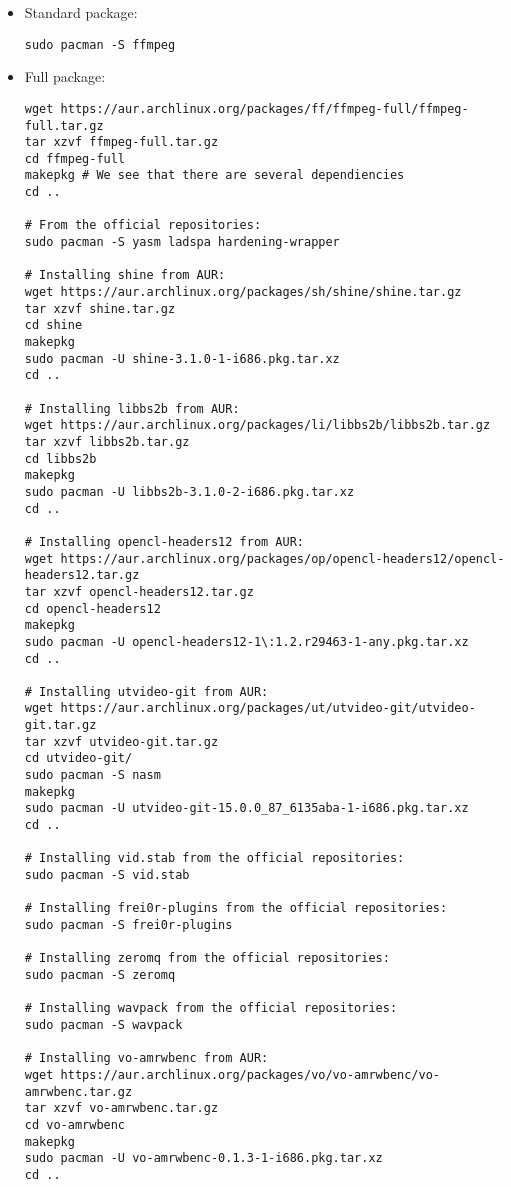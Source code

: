 \begin{itemize}
\item Standard package:

\begin{verbatim}
sudo pacman -S ffmpeg
\end{verbatim}


\item Full package:
\begin{verbatim}
wget https://aur.archlinux.org/packages/ff/ffmpeg-full/ffmpeg-full.tar.gz
tar xzvf ffmpeg-full.tar.gz
cd ffmpeg-full
makepkg # We see that there are several dependiencies
cd ..

# From the official repositories:
sudo pacman -S yasm ladspa hardening-wrapper

# Installing shine from AUR:
wget https://aur.archlinux.org/packages/sh/shine/shine.tar.gz
tar xzvf shine.tar.gz
cd shine
makepkg
sudo pacman -U shine-3.1.0-1-i686.pkg.tar.xz
cd ..

# Installing libbs2b from AUR:
wget https://aur.archlinux.org/packages/li/libbs2b/libbs2b.tar.gz
tar xzvf libbs2b.tar.gz
cd libbs2b
makepkg
sudo pacman -U libbs2b-3.1.0-2-i686.pkg.tar.xz
cd ..

# Installing opencl-headers12 from AUR:
wget https://aur.archlinux.org/packages/op/opencl-headers12/opencl-headers12.tar.gz
tar xzvf opencl-headers12.tar.gz
cd opencl-headers12
makepkg
sudo pacman -U opencl-headers12-1\:1.2.r29463-1-any.pkg.tar.xz
cd ..

# Installing utvideo-git from AUR:
wget https://aur.archlinux.org/packages/ut/utvideo-git/utvideo-git.tar.gz
tar xzvf utvideo-git.tar.gz 
cd utvideo-git/
sudo pacman -S nasm
makepkg
sudo pacman -U utvideo-git-15.0.0_87_6135aba-1-i686.pkg.tar.xz
cd ..

# Installing vid.stab from the official repositories:
sudo pacman -S vid.stab

# Installing frei0r-plugins from the official repositories:
sudo pacman -S frei0r-plugins

# Installing zeromq from the official repositories:
sudo pacman -S zeromq

# Installing wavpack from the official repositories:
sudo pacman -S wavpack

# Installing vo-amrwbenc from AUR:
wget https://aur.archlinux.org/packages/vo/vo-amrwbenc/vo-amrwbenc.tar.gz
tar xzvf vo-amrwbenc.tar.gz
cd vo-amrwbenc
makepkg
sudo pacman -U vo-amrwbenc-0.1.3-1-i686.pkg.tar.xz
cd ..


\end{verbatim}
\end{itemize}
